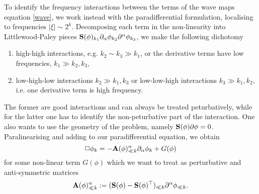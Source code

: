 To identify the frequency interactions between the terms of the wave maps equation \eqref{wave}, we work instead with the paradifferential formulation, localising to frequencies $|\xi| \sim 2^k$. Decomposing each term in the non-linearity into Littlewood-Paley pieces ${\bf S}(\phi)_{k_1} \partial_\alpha \phi_{k_2}\partial^\alpha \phi_{k_3}$, we make the following dichotomy
	\begin{enumerate}
		\item high-high interactions, e.g. $k_2 \sim k_3 \gg k_1$, or the derivative terms have low frequencies, $k_1 \gg k_2, k_3$, 
		
		\item low-high-low interactions $k_2 \gg k_1, k_3$ or low-low-high interactions $k_3 \gg k_1, k_2$, i.e. one derivative term is high frequency.
	\end{enumerate}
The former are good interactions and can always be treated peturbatively, while for the latter one has to identify the non-peturbative part of the interaction. One also wants to use the geometry of the problem, namely ${\bf S}(\phi) \partial \phi = 0$. Paralinearising and adding to our paradifferential equation, we obtain 
	\[
		\Box \phi_k = - {\bf A}(\phi)^\alpha_{\ll k} \partial_\alpha \phi_k + G(\phi)
	\]
for some non-linear term $G(\phi)$ which we want to treat as perturbative and anti-symmetric matrices
	\[
		{\bf A}(\phi)^\alpha_{\ll k} := ({\bf S}(\phi) - {\bf S}(\phi)^\top)_{\ll k} \partial^\alpha \phi_{\ll k}.
	\]
	

